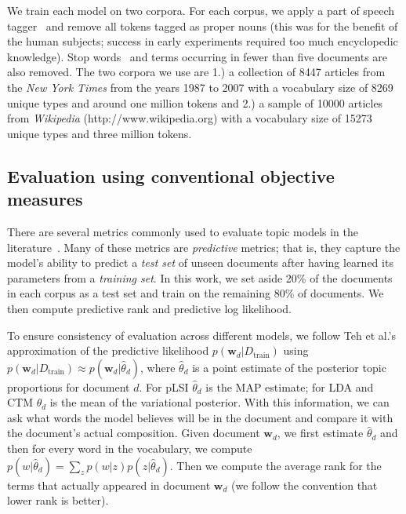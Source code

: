 


We train each model on two corpora.  For each corpus, we apply a part
of speech tagger~\cite{schmid-94} and remove all tokens tagged as
proper nouns (this was for the benefit of the human subjects; success
in early experiments required too much encyclopedic knowledge).  Stop
words~\cite{loper-02} and terms occurring in fewer than five documents
are also removed. The two corpora we use are 1.) a collection of 8447
articles from the \textit{New York Times} from the years 1987 to 2007
with a vocabulary size of 8269 unique types and around one million
tokens and 2.)  a sample of 10000 articles from \textit{Wikipedia}
(http://www.wikipedia.org) with a vocabulary size of 15273 unique
types and three million tokens.

\subsection{Evaluation using conventional objective measures}
\label{sec:evalmetrics}

There are several metrics commonly used to evaluate topic models in
the literature~\cite{wallach-09}.  Many of these metrics are
\emph{predictive} metrics; that is, they capture the model's ability
to predict a \emph{test set} of unseen documents after having learned
its parameters from a \emph{training set}.  In this work, we set aside
20\% of the documents in each corpus as a test set and train on the
remaining 80\% of documents.  We then compute predictive rank and
predictive log likelihood.

To ensure consistency of evaluation across different models, we follow
Teh et al.'s~\cite{TehKurWel2008} approximation of the predictive
likelihood $p(\textbf{w}_d|D_{\textrm{train}})$ using $p({\bm
  w}_d|D_{\textrm{train}}) \approx p({\bm w}_d|\hat{\theta}_d)$, where
$\hat{\theta}_d$ is a point estimate of the posterior topic
proportions for document $d$. For pLSI $\hat{\theta}_d$ is the MAP
estimate; for LDA and CTM $\hat{\theta}_d$ is the mean of the
variational posterior.
With this information, we can ask what words the model believes will
be in the document and compare it with the document's actual
composition.  Given document $\bm w_d$, we first estimate
$\hat{\theta}_d$ and then for every word in the vocabulary, we compute
$p(w|\hat{\theta}_d) = \sum_z p(w|z)p(z|\hat{\theta}_d)$.  Then we
compute the average rank for the terms that actually appeared in document
$\bm w_d$ (we follow the convention that lower rank is better).


